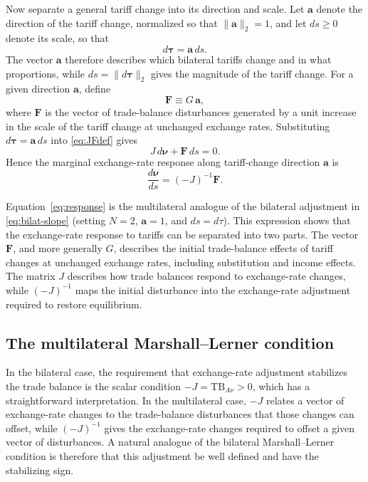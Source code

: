 \documentclass[11pt]{article}
\begin{document}
Now separate a general tariff change into its direction and scale. Let $\boldsymbol{a}$ denote the direction of the tariff change, normalized so that $\|\boldsymbol{a}\|_2=1$, and let $ds\geq0$ denote its scale, so that
\[
d\boldsymbol{\tau}=\boldsymbol{a}\,ds.
\]
The vector $\boldsymbol{a}$ therefore describes which bilateral tariffs change and in what proportions, while $ds=\|d\boldsymbol{\tau}\|_2$ gives the magnitude of the tariff change. For a given direction $\boldsymbol{a}$, define
\begin{equation}
\boldsymbol{F}\equiv G\,\boldsymbol{a},
\end{equation}
where $\boldsymbol{F}$ is the vector of trade-balance disturbances generated by a unit increase in the scale of the tariff change at unchanged exchange rates. Substituting $d\boldsymbol{\tau}=\boldsymbol{a}\,ds$ into \eqref{eq:JFdef} gives
\begin{equation}
J\,d\boldsymbol{\nu}+\boldsymbol{F}\,ds=0.
\label{eq:system}
\end{equation}
Hence the marginal exchange-rate response along tariff-change direction $\boldsymbol{a}$ is
\begin{equation}
\frac{d\boldsymbol{\nu}}{ds}=(-J)^{-1}\boldsymbol{F}.
\label{eq:response}
\end{equation}

Equation~\eqref{eq:response} is the multilateral analogue of the bilateral adjustment in \eqref{eq:bilat-slope} (setting $N=2$, $\boldsymbol{a}=1$, and $ds=d\tau$). This expression shows that the exchange-rate response to tariffs can be separated into two parts. The vector $\boldsymbol{F}$, and more generally $G$, describes the initial trade-balance effects of tariff changes at unchanged exchange rates, including substitution and income effects. The matrix $J$ describes how trade balances respond to exchange-rate changes, while $(-J)^{-1}$ maps the initial disturbance into the exchange-rate adjustment required to restore equilibrium.

\subsection{The multilateral Marshall--Lerner condition}

In the bilateral case, the requirement that exchange-rate adjustment stabilizes the trade balance is the scalar condition $-J=\mathrm{TB}_{A\nu}>0$, which has a straightforward interpretation. In the multilateral case, $-J$ relates a vector of exchange-rate changes to the trade-balance disturbances that those changes can offset, while $(-J)^{-1}$ gives the exchange-rate changes required to offset a given vector of disturbances. A natural analogue of the bilateral Marshall--Lerner condition is therefore that this adjustment be well defined and have the stabilizing sign.
\end{document}
